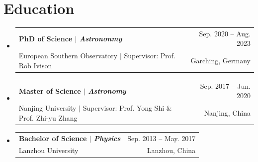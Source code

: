 \documentclass[A4,11pt]{article}
\makeatletter
\newcommand{\CVSubheading}[4]{
  \vspace{-2pt}\item
    \begin{tabular*}{0.97\textwidth}[t]{l@{\extracolsep{\fill}}r}
      \textbf{#1} & #2 \\
      \small#3 & \small #4 \\
    \end{tabular*}\vspace{-7pt}
}
\newcommand{\CVSubHeadingListStart}{\begin{itemize}[leftmargin=0.5cm, label={}]}
\newcommand{\CVSubHeadingListEnd}{\end{itemize}}
\makeatother
\begin{document}

\section{Education}
  \CVSubHeadingListStart
    \CVSubheading
      {{PhD of Science $|$ \emph{\small{Astrononmy}}}}{Sep. 2020 -- Aug. 2023}
      {European Southern Observatory $|$ Supervisor: Prof. Rob Ivison}{Garching, Germany}
    \CVSubheading
      {{Master of Science $|$ \emph{\small{Astronomy}}}}{Sep. 2017 -- Jun. 2020}
      {Nanjing University $|$ Supervisor: Prof. Yong Shi \& Prof. Zhi-yu Zhang}{Nanjing, China}
    \CVSubheading
      {{Bachelor of Science $|$ \emph{\small{Physics}}}}{Sep. 2013 -- May. 2017}
      {Lanzhou University}{Lanzhou, China}
  \CVSubHeadingListEnd
\end{document}
